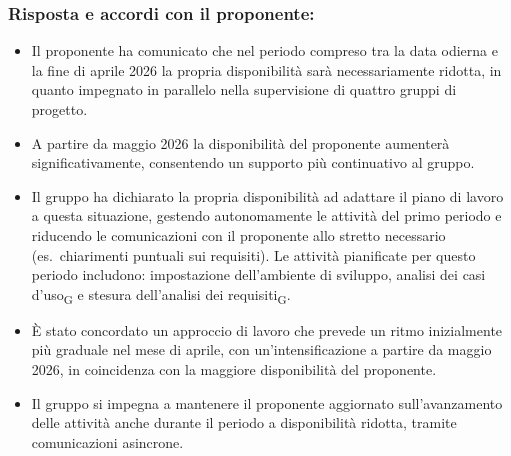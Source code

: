 \subsubsection*{Risposta e accordi con il proponente:}
 
\begin{itemize}
    \item Il proponente ha comunicato che nel periodo compreso tra la data
      odierna e la fine di aprile 2026 la propria disponibilità sarà
      necessariamente ridotta, in quanto impegnato in parallelo nella
      supervisione di quattro gruppi di progetto.
    \item A partire da maggio 2026 la disponibilità del proponente aumenterà
          significativamente, consentendo un supporto più continuativo al gruppo.
    \item Il gruppo ha dichiarato la propria disponibilità ad adattare il piano
      di lavoro a questa situazione, gestendo autonomamente le attività del
      primo periodo e riducendo le comunicazioni con il proponente allo
      stretto necessario (es.\ chiarimenti puntuali sui requisiti). Le attività
      pianificate per questo periodo includono: impostazione dell'ambiente di
      sviluppo, analisi dei casi d'uso\textsubscript{G} e stesura dell'analisi dei requisiti\textsubscript{G}.
    \item È stato concordato un approccio di lavoro che prevede un ritmo
          inizialmente più graduale nel mese di aprile, con un'intensificazione
          a partire da maggio 2026, in coincidenza con la maggiore disponibilità
          del proponente.
    \item Il gruppo si impegna a mantenere il proponente aggiornato sull'avanzamento
          delle attività anche durante il periodo a disponibilità ridotta,
          tramite comunicazioni asincrone.
\end{itemize}

